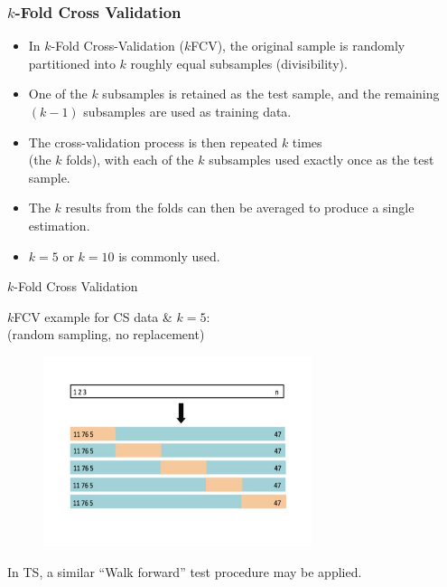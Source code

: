 \documentclass{beamer}
\begin{document}
\begin{frame}
\frametitle{$k$-Fold Cross Validation}

\begin{itemize}
  \item In $k$-Fold Cross-Validation ($k$FCV), the original sample is randomly partitioned into $k$ roughly equal subsamples (divisibility). 
  \smallskip
  \item One of the $k$ subsamples is retained as the test sample, and the remaining $(k-1)$ subsamples are used as training data. 
  \smallskip
  \item The cross-validation process is then repeated $k$ times \\(the $k$ folds), with each of the $k$ subsamples used exactly once as the test sample. 
  \smallskip
  \item The $k$ results from the folds can then be averaged to produce a single estimation. 
  \smallskip
  \item $k = 5$ or $k=10$ is commonly used.
\end{itemize}  
\end{frame}
\begin{frame}{$k$-Fold Cross Validation}
\begin{center}
$k$FCV example for CS data \& $k=5$: \\
(random sampling, no replacement)
\begin{figure}
\includegraphics[width=0.7\textwidth]{img/kFCV2.pdf}
\end{figure}
In TS, a similar ``Walk forward'' test procedure may be applied.
\end{center}
\end{frame}
\end{document}
